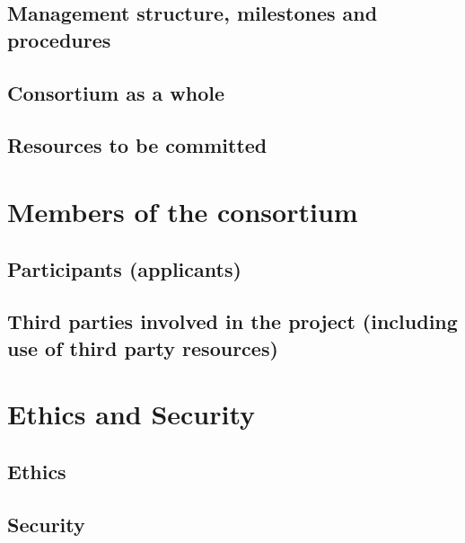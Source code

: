 \documentclass[12pt]{book}
\begin{document}
\section{Management structure, milestones and procedures}


 
\section{Consortium as a whole}

\section{Resources to be committed}

\chapter{Members of the consortium}

\section{Participants (applicants)}



\section{Third parties involved in the project (including use of third party resources)}


\chapter{Ethics and Security}

\section{Ethics}

\section{Security}








\end{document}
